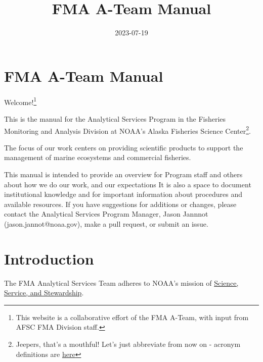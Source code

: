 \documentclass[
  letterpaper,
  DIV=11,
  numbers=noendperiod]{scrreprt}
\title{FMA A-Team Manual}
\author{}
\date{2023-07-19}
\renewcommand*\contentsname{Table of contents}
\newcommand\contentsname{Table of contents}
\begin{document}
\maketitle
\ifdefined\Shaded\renewenvironment{Shaded}{\begin{tcolorbox}[frame hidden, boxrule=0pt, sharp corners, interior hidden, breakable, borderline west={3pt}{0pt}{shadecolor}, enhanced]}{\end{tcolorbox}}\fi

\renewcommand*\contentsname{Table of contents}
{
\hypersetup{linkcolor=}
\setcounter{tocdepth}{2}
\tableofcontents
}

\hypertarget{fma-a-team-manual}{%
\chapter{FMA A-Team Manual}\label{fma-a-team-manual}}

Welcome!\footnote{This website is a collaborative effort of the FMA
  A-Team, with input from AFSC FMA Division staff.}

This is the manual for the Analytical Services Program in the Fisheries
Monitoring and Analysis Division at NOAA's Alaska Fisheries Science
Center\footnote{Jeepers, that's a mouthful! Let's just abbreviate from
  now on - acronym definitions are
  \protect\hyperlink{sec-acronyms}{here}}.

The focus of our work centers on providing scientific products to
support the management of marine ecosystems and commercial fisheries.

This manual is intended to provide an overview for Program staff and
others about how we do our work, and our expectations It is also a space
to document institutional knowledge and for important information about
procedures and available resources. If you have suggestions for
additions or changes, please contact the Analytical Services Program
Manager, Jason Jannnot (jason.jannot@noaa.gov), make a pull request, or
submit an issue.


\hypertarget{intro}{%
\chapter{Introduction}\label{intro}}

The FMA Analytical Services Team adheres to NOAA's mission of
\href{https://www.noaa.gov/our-mission-and-vision}{Science, Service, and
Stewardship}.
\end{document}
